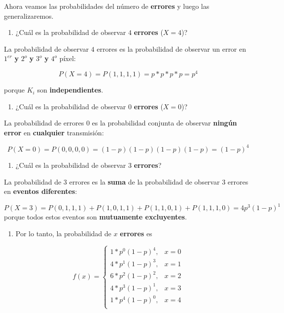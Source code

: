 \documentclass[
]{book}
\providecommand{\tightlist}{%
  \setlength{\itemsep}{0pt}\setlength{\parskip}{0pt}}
\begin{document}
Ahora veamos las probabilidades del número de \textbf{errores} y luego las generalizaremos.

\begin{enumerate}
\def\labelenumi{\arabic{enumi})}
\tightlist
\item
  ¿Cuál es la probabilidad de observar \(4\) \textbf{errores} (\(X=4\))?
\end{enumerate}

La probabilidad de observar \(4\) errores es la probabilidad de observar un error en \(1^{er}\) \textbf{y} \(2^{o}\) \textbf{y} \(3^{o}\) \textbf{y} \(4 ^{o}\) píxel:

\[P(X=4)=P(1,1,1,1)=p*p*p*p=p^4\]

porque \(K_i\) son \textbf{independientes}.

\begin{enumerate}
\def\labelenumi{\arabic{enumi})}
\setcounter{enumi}{1}
\tightlist
\item
  ¿Cuál es la probabilidad de observar \(0\) \textbf{errores} (\(X=0\))?
\end{enumerate}

La probabilidad de errores \(0\) es la probabilidad conjunta de observar \textbf{ningún error} en \textbf{cualquier} transmisión:

\[P(X=0)=P(0,0,0,0)=(1-p)(1-p)(1-p)(1-p)=(1-p)^4\]

\begin{enumerate}
\def\labelenumi{\arabic{enumi})}
\setcounter{enumi}{2}
\tightlist
\item
  ¿Cuál es la probabilidad de observar \(3\) \textbf{errores}?
\end{enumerate}

La probabilidad de \(3\) errores es la \textbf{suma} de la probabilidad de observar \(3\) errores en \textbf{eventos diferentes}:

\[P(X=3)=P(0,1,1,1)+P(1,0,1,1)+P(1,1,0,1)+P(1,1,1, 0)=4p^3(1-p)^1\]
porque todos estos eventos son \textbf{mutuamente excluyentes}.

\begin{enumerate}
\def\labelenumi{\arabic{enumi})}
\setcounter{enumi}{3}
\tightlist
\item
  Por lo tanto, la probabilidad de \(x\) \textbf{errores} es
\end{enumerate}

\[
    f(x)= 
\begin{cases}
    1*p^0(1-p)^4,&  x=0 \\
    4*p^1(1-p)^3,&  x=1 \\
    6*p^2(1-p)^2,&  x=2 \\
    4*p^3(1-p)^1,&  x=3 \\
    1*p^4(1-p)^0,&  x=4 \\
\end{cases}
\]
\end{document}
